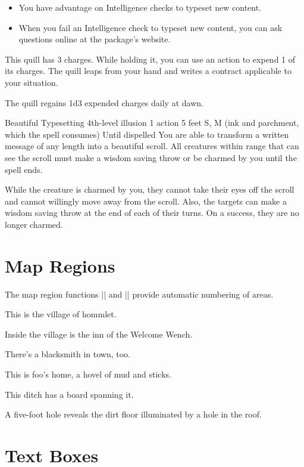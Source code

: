 \begin{itemize}
  \item You have advantage on Intelligence checks to typeset new content.
  \item When you fail an Intelligence check to typeset new content, you can ask questions online at the package's website.
\end{itemize}

This quill has 3 charges. While holding it, you can use an action to expend 1 of its charges. The quill leaps from your hand and writes a contract applicable to your situation.

The quill regains 1d3 expended charges daily at dawn.

\DndSpellHeader%
  {Beautiful Typesetting}
  {4th-level illusion}
  {1 action}
  {5 feet}
  {S, M (ink and parchment, which the spell consumes)}
  {Until dispelled}
You are able to transform a written message of any length into a beautiful scroll. All creatures within range that can see the scroll must make a wisdom saving throw or be charmed by you until the spell ends.

While the creature is charmed by you, they cannot take their eyes off the scroll and cannot willingly move away from the scroll. Also, the targets can make a wisdom saving throw at the end of each of their turns. On a success, they are no longer charmed.

\section{Map Regions}
The map region functions |\DndArea| and |\DndSubArea| provide automatic numbering of areas.

This is the village of hommlet.

Inside the village is the inn of the Welcome Wench.

There's a blacksmith in town, too.

This is foo's home, a hovel of mud and sticks.

This ditch has a board spanning it.

A five-foot hole reveals the dirt floor illuminated by a hole in the roof.

\section{Text Boxes}


